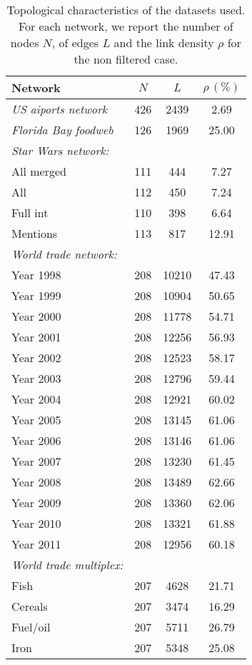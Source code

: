 \documentclass[aps,twocolumn,superscriptaddress]{revtex4-1}
\begin{document}
\begin{table}[t]
\centering
\begin{tabular}[c]{l|ccc}
\hline\hline
\bf{Network} & $N$ & $L$ & $\rho \, (\%)$ \\\hline\hline
\emph{US aiports network} & 426 & 2439 & 2.69 \\
\hline
\emph{Florida Bay foodweb} & 126 & 1969 & 25.00 \\
\hline
\emph{Star Wars network: }&&&\\
All merged & 111 & 444 & 7.27 \\
All & 112 & 450 & 7.24 \\
Full int & 110 & 398 & 6.64 \\
Mentions & 113 & 817 & 12.91 \\\hline
%
\emph{World trade network: }&&& \\
%
Year 1998 & 208 & 10210 & 47.43 \\
Year  1999 & 208 & 10904 & 50.65 \\
Year  2000 & 208 & 11778 & 54.71 \\
Year  2001 & 208 & 12256 & 56.93 \\
Year  2002 & 208 & 12523 & 58.17 \\
Year  2003 & 208 & 12796 & 59.44 \\
Year  2004 & 208 & 12921 & 60.02 \\
Year  2005 & 208 & 13145 & 61.06 \\
Year  2006 & 208 & 13146 & 61.06 \\
Year  2007 & 208 & 13230 & 61.45 \\
Year  2008 & 208 & 13489 & 62.66 \\
Year  2009 & 208 & 13360 & 62.06 \\
Year  2010 & 208 & 13321 & 61.88 \\
Year  2011 & 208 & 12956 & 60.18 \\\hline
%
\emph{World trade multiplex:  }&&& \\%
%
 Fish & 207 & 4628 & 21.71 \\
 Cereals & 207 & 3474 & 16.29 \\
 Fuel/oil & 207 & 5711 & 26.79 \\
 Iron & 207 & 5348 & 25.08 \\\hline\hline
%
\end{tabular}
%
\caption{Topological characteristics of the datasets used. For each network, we report the number of nodes $N$, of edges $L$ and the link density $\rho$ for the non filtered case.}
\label{tab:datasets}
\end{table}
%
\end{document}
